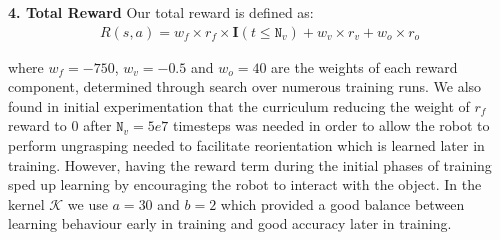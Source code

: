 \documentclass[letterpaper, 10 pt, conference]{ieeeconf}  %
\begin{document}
 \noindent \textbf{4. Total Reward} Our total reward is defined as:
\vspace{-4pt}
\begin{multline*}
R(s, a) = w_{f} \times r_f \times  \mathbf{I}(t \leq \texttt{N}_v)
+ w_{v} \times r_v
+ w_{o} \times r_o
\end{multline*}
\vspace{-15pt}

where $w_{f}=-750$, $w_{v}=-0.5$ and $w_{o}=40$ are the weights of each reward component, determined through search over numerous training runs. We also found in initial experimentation that the curriculum reducing the weight of $r_f$ reward to $0$ after $\texttt{N}_v=5e7$ timesteps was needed in order to allow the robot to perform ungrasping needed to facilitate reorientation which is learned later in training. However, having the reward term during the initial phases of training sped up learning by encouraging the robot to interact with the object. In the kernel $\mathcal K$ we use $a=30$ and $b=2$ which provided a good balance between learning behaviour early in training and good accuracy later in training.




\end{document}
